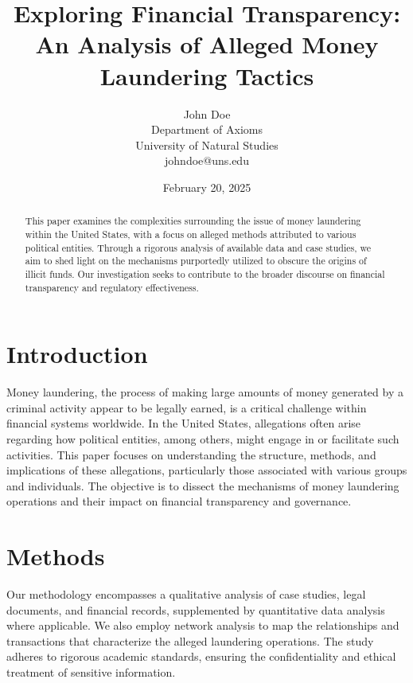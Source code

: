 \documentclass{article}
\title{Exploring Financial Transparency: An Analysis of Alleged Money Laundering Tactics}
\author{John Doe \\ Department of Axioms \\ University of Natural Studies \\ johndoe@uns.edu}
\date{February 20, 2025}
\begin{document}
\maketitle

\begin{abstract}
This paper examines the complexities surrounding the issue of money laundering within the United States, with a focus on alleged methods attributed to various political entities. Through a rigorous analysis of available data and case studies, we aim to shed light on the mechanisms purportedly utilized to obscure the origins of illicit funds. Our investigation seeks to contribute to the broader discourse on financial transparency and regulatory effectiveness.
\end{abstract}

\section{Introduction}
Money laundering, the process of making large amounts of money generated by a criminal activity appear to be legally earned, is a critical challenge within financial systems worldwide. In the United States, allegations often arise regarding how political entities, among others, might engage in or facilitate such activities. This paper focuses on understanding the structure, methods, and implications of these allegations, particularly those associated with various groups and individuals. The objective is to dissect the mechanisms of money laundering operations and their impact on financial transparency and governance.

\section{Methods}
Our methodology encompasses a qualitative analysis of case studies, legal documents, and financial records, supplemented by quantitative data analysis where applicable. We also employ network analysis to map the relationships and transactions that characterize the alleged laundering operations. The study adheres to rigorous academic standards, ensuring the confidentiality and ethical treatment of sensitive information.
\end{document}
